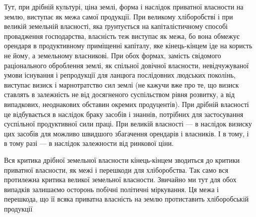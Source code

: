 Тут, при дрібній культурі, ціна землі, форма і наслідок приватної власности
на землю, виступає як межа самої продукції. При великому хліборобстві
і при великій земельній власності, яка ґрунтується на капіталістичному способі
провадження господарства, власність теж виступає як межа, бо вона обмежує
орендаря в продуктивному приміщенні капіталу, яке кінець-кінцем іде на
користь не йому, а земельному власникові. При обох формах, замість свідомого
раціонального оброблення землі, як спільної довічної власности, невідчужуваної
умови існування і репродукції для ланцюга послідовних людських поколінь, виступає
визиск і марнотратство сил землі (не кажучи вже про те, що визиск
ставлять в залежність не від досягненого суспільством рівня розвитку, а від випадкових,
неоднакових обставин окремих продуцентів). При дрібній власності
це відбувається в наслідок браку засобів і знаннів, потрібних для застосування
суспільної продуктивної сили праці. При великій власності — в наслідок визиску
цих засобів для можливо швидшого збагачення орендарів і власників. І в тому,
і в тому разі — в наслідок залежности від ринкової ціни.

Вся критика дрібної земельної власности кінець-кінцем зводиться до критики
приватної власности, як межі і перешкоди для хліборобства. Так само вся
протилежна критика великої земельної власности. Звичайно ми тут для обох
випадків залишаємо осторонь побічні політичні міркування. Ця межа і перешкода,
що її всяка приватна власність на землю протиставить хліборобській продукції
